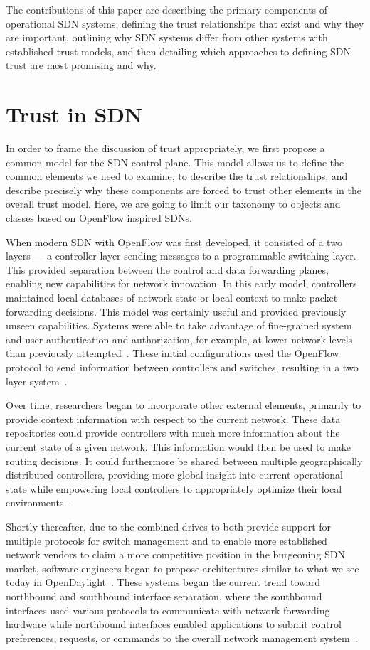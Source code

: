 \documentclass[10pt,conference]{IEEEtran}
\begin{document}
The contributions of this paper are describing the primary components of operational SDN systems, defining the trust relationships that exist and why they are important, outlining why SDN systems differ from other systems with established trust models, and then detailing which approaches to defining SDN trust are most promising and why.

\section{Trust in SDN}
In order to frame the discussion of trust appropriately, we first propose a common model for the SDN control plane.  This model allows us to define the common elements we need to examine, to describe the trust relationships, and describe precisely why these components are forced to trust other elements in the overall trust model.  Here, we are going to limit our taxonomy to objects and classes based on OpenFlow inspired SDNs.

When modern SDN with OpenFlow was first developed, it consisted of a two layers --- a controller layer sending messages to a programmable switching layer.  This provided separation between the control and data forwarding planes, enabling new capabilities for network innovation.  In this early model, controllers maintained local databases of network state or local context to make packet forwarding decisions.  This model was certainly useful and provided previously unseen capabilities.  Systems were able to take advantage of fine-grained system and user authentication and authorization, for example, at lower network levels than previously attempted~\cite{CaFrPeLu:07}.  These initial configurations used the OpenFlow protocol to send information between controllers and switches, resulting in a two layer system~\cite{openflow1.0}.

Over time, researchers began to incorporate other external elements, primarily to provide context information with respect to the current network.  These data repositories could provide controllers with much more information about the current state of a given network.  This information would then be used to make routing decisions.  It could furthermore be shared between multiple geographically distributed controllers, providing more global insight into current operational state while empowering local controllers to appropriately optimize their local environments~\cite{HeShMc:12,ScSu:13}.

Shortly thereafter, due to the combined drives to both provide support for multiple protocols for switch management and to enable more established network vendors to claim a more competitive position in the burgeoning SDN market, software engineers began to propose architectures similar to what we see today in OpenDaylight~\cite{opendaylight}.  These systems began the current trend toward northbound and southbound interface separation, where the southbound interfaces used various protocols to communicate with network forwarding hardware while northbound interfaces enabled applications to submit control preferences, requests, or commands to the overall network management system~\cite{opendaylight,big_network_controller}.
\end{document}

